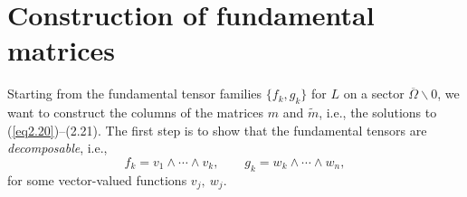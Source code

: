 \documentclass{surv-l}
\theoremstyle{plain}
\theoremstyle{definition}
\numberwithin{equation}{chapter}
\begin{document}
\section{Construction of fundamental matrices}\label{sec7}
Starting from the fundamental tensor families $\{f_{k}, g_{k}\}$ for $L$ on a sector $\overline{\Omega}\backslash 0$, we want to construct the columns of the matrices $m$ and $\tilde{m}$, i.e., the solutions to (\ref{eq2.20})--(2.21). The first step is to show that the fundamental tensors are \emph{decomposable}, i.e.,
\begin{equation*}
 f_{k}=v_{1}\wedge\cdots\wedge v_{k},\qquad  g_{k}=w_{k}\wedge\cdots\wedge w_{n},
\end{equation*}
for some vector-valued functions $v_{j},\ w_{j}$.
\end{document}
